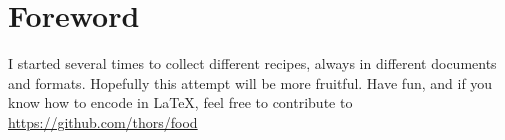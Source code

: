 \section*{Foreword}
I started several times to collect different recipes, always in different documents and formats. Hopefully this attempt will be more fruitful. Have fun, and if you know how to encode in \LaTeX, feel free to contribute to \url{https://github.com/thors/food}
